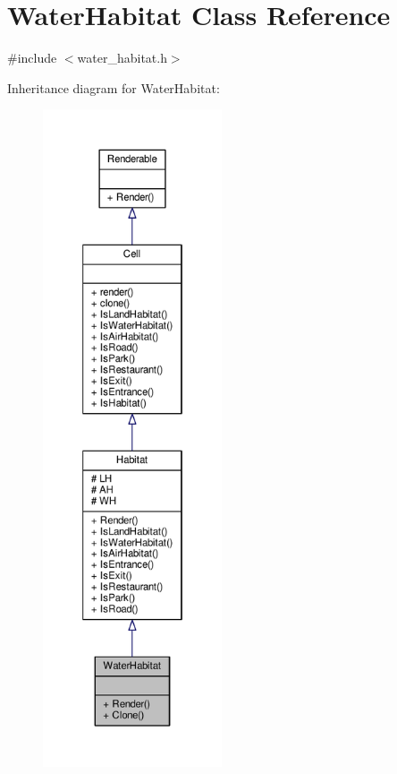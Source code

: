 \hypertarget{classWaterHabitat}{}\section{Water\+Habitat Class Reference}
\label{classWaterHabitat}


{\ttfamily \#include $<$water\+\_\+habitat.\+h$>$}



Inheritance diagram for Water\+Habitat\+:
\nopagebreak
\begin{figure}[H]
\begin{center}
\leavevmode
\includegraphics[height=550pt]{classWaterHabitat__inherit__graph}
\end{center}
\end{figure}


